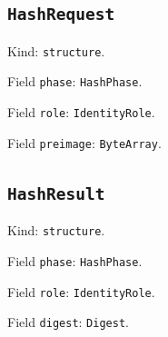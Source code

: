\documentclass[11pt]{article}
\begin{document}
\subsection*{\texttt{HashRequest}}
\noindent Kind: \texttt{structure}.\par
\noindent Field \texttt{phase}: \texttt{HashPhase}.\par
\noindent Field \texttt{role}: \texttt{IdentityRole}.\par
\noindent Field \texttt{preimage}: \texttt{ByteArray}.\par
\subsection*{\texttt{HashResult}}
\noindent Kind: \texttt{structure}.\par
\noindent Field \texttt{phase}: \texttt{HashPhase}.\par
\noindent Field \texttt{role}: \texttt{IdentityRole}.\par
\noindent Field \texttt{digest}: \texttt{Digest}.\par
\end{document}
